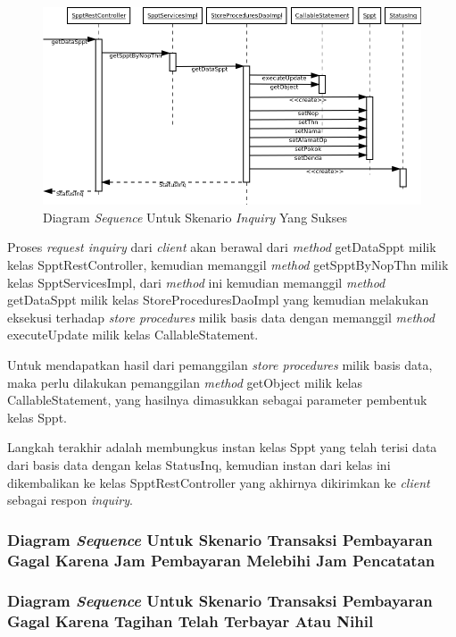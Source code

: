 \documentclass[pdftex,12pt, oneside]{article}
\begin{document}
\begin{figure}[H]
  \centering
  \includegraphics[width=1\textwidth]{./resources/uml/uml-seq-inquiry}
  \caption{Diagram \textit{Sequence} Untuk Skenario \textit{Inquiry} Yang Sukses}
  \label{fig:uml-seq-inquiry}
\end{figure}

Proses \textit{request inquiry} dari \textit{client} akan berawal dari \textit{method} getDataSppt milik kelas SpptRestController, kemudian memanggil \textit{method} getSpptByNopThn milik kelas SpptServicesImpl, dari \textit{method} ini kemudian memanggil \textit{method} getDataSppt milik kelas StoreProceduresDaoImpl yang kemudian melakukan eksekusi terhadap \textit{store procedures} milik basis data dengan memanggil \textit{method} executeUpdate milik kelas CallableStatement.

Untuk mendapatkan hasil dari pemanggilan \textit{store procedures} milik basis data, maka perlu dilakukan pemanggilan \textit{method} getObject milik kelas CallableStatement, yang hasilnya dimasukkan sebagai parameter pembentuk kelas Sppt.

Langkah terakhir adalah membungkus instan kelas Sppt yang telah terisi data dari basis data dengan kelas StatusInq, kemudian instan dari kelas ini dikembalikan ke kelas SpptRestController yang akhirnya dikirimkan ke \textit{client} sebagai respon \textit{inquiry}.

\subsubsection{Diagram \textit{Sequence} Untuk Skenario Transaksi Pembayaran Gagal Karena Jam Pembayaran Melebihi Jam Pencatatan}
\subsubsection{Diagram \textit{Sequence} Untuk Skenario Transaksi Pembayaran Gagal Karena Tagihan Telah Terbayar Atau Nihil}
\end{document}
